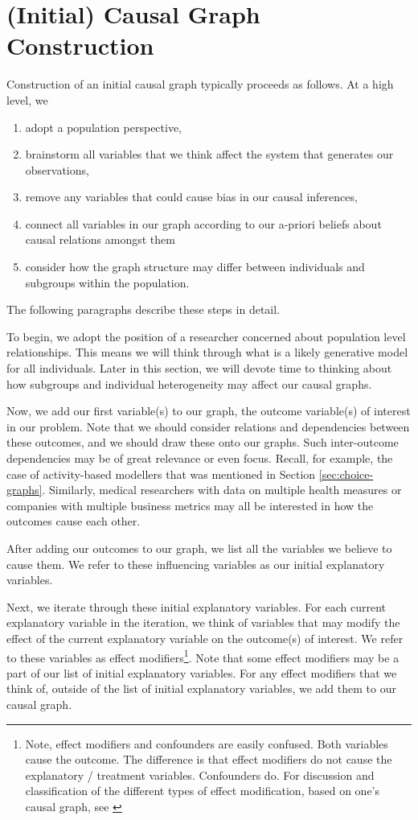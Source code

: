 \section{(Initial) Causal Graph Construction}
\label{sec:graph-construction}

Construction of an initial causal graph typically proceeds as follows.
At a high level, we
\begin{enumerate}
   \item adopt a population perspective,
   \item brainstorm all variables that we think affect the system that generates our observations,
   \item remove any variables that could cause bias in our causal inferences,
   \item connect all variables in our graph according to our a-priori beliefs about causal relations amongst them
   \item consider how the graph structure may differ between individuals and subgroups within the population.
\end{enumerate}
The following paragraphs describe these steps in detail.

To begin, we adopt the position of a researcher concerned about population level relationships.
This means we will think through what is a likely generative model for all individuals.
Later in this section, we will devote time to thinking about how subgroups and individual heterogeneity may affect our causal graphs.

Now, we add our first variable(s) to our graph, the outcome variable(s) of interest in our problem.
Note that we should consider relations and dependencies between these outcomes, and we should draw these onto our graphs.
Such inter-outcome dependencies may be of great relevance or even focus.
Recall, for example, the case of activity-based modellers that was mentioned in Section \ref{sec:choice-graphs}.
Similarly, medical researchers with data on multiple health measures or companies with multiple business metrics may all be interested in how the outcomes cause each other.

After adding our outcomes to our graph, we list all the variables we believe to cause them.
We refer to these influencing variables as our initial explanatory variables.

Next, we iterate through these initial explanatory variables.
For each current explanatory variable in the iteration, we think of variables that may modify the effect of the current explanatory variable on the outcome(s) of interest.
We refer to these variables as effect modifiers\footnote{Note, effect modifiers and confounders are easily confused. Both variables cause the outcome. The difference is that effect modifiers do not cause the explanatory / treatment variables. Confounders do. For discussion and classification of the different types of effect modification, based on one's causal graph, see \citet{vanderweele_2007_four}}.
Note that some effect modifiers may be a part of our list of initial explanatory variables.
For any effect modifiers that we think of, outside of the list of initial explanatory variables, we add them to our causal graph.

